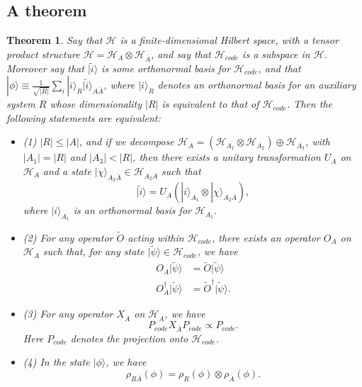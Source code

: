 \documentclass[12pt]{article}
\newcommand{\be}{\begin{equation}}
\newcommand{\ee}{\end{equation}}
\newcommand{\bi}{\begin{itemize}}
\newcommand{\ei}{\end{itemize}}
\newcommand{\ran}{\rangle}
\newcommand{\wt}{\widetilde}
\newcommand{\Hh}{\mathcal{H}}
\newcommand{\HA}{\mathcal{H}_A}
\newcommand{\HAb}{\mathcal{H}_{\ol{A}}}
\newcommand{\Ab}{\ol{A}}
\newcommand{\Hc}{\mathcal{H}_{code}}
\newcommand{\ol}{\overline}
\newtheorem{thm}{Theorem}[section]
\begin{document}
\subsection{A theorem}
\begin{thm}\label{cthm}
Say that $\Hh$ is a finite-dimensional Hilbert space, with a tensor product structure $\Hh=\HA\otimes\HAb$, and say that $\Hc$ is a subspace in $\Hh$.  Moreover say that $|\wt{i}\ran$ is some orthonormal basis for $\Hc$, and that $|\phi\ran\equiv \frac{1}{\sqrt{|R|}} \sum_i |i\ran_R|\wt{i}\ran_{A\ol{A}}$, where $|i\ran_R$ denotes an orthonormal basis for an auxiliary system $R$ whose dimensionality $|R|$ is equivalent to that of $\Hc$.  Then the following statements are equivalent:
\bi
\item[(1)] $|R|\leq |A|$, and if we decompose $\HA=(\Hh_{A_1}\otimes\Hh_{A_2})\oplus \Hh_{A_3}$, with $|A_1|=|R|$ and $|A_3|<|R|$, then there exists a unitary transformation $U_A$ on $\HA$ and a state $|\chi\ran_{A_2\ol{A}}\in \Hh_{A_2\ol{A}}$ such that
\be
|\wt{i}\ran=U_A\left(|i\ran_{A_1}\otimes |\chi\ran_{A_2\ol{A}}\right),
\ee
where $|i\ran_{A_1}$ is an orthonormal basis for $\Hh_{A_1}$.

\item[(2)] For any operator $\wt{O}$ acting within $\Hc$, there exists an operator $O_A$ on $\HA$ such that, for any state $|\wt{\psi}\ran\in \Hc$, we have
\begin{align}\nonumber
O_A|\wt{\psi}\ran&=\wt{O}|\wt{\psi}\ran\\
O_A^\dagger|\wt{\psi}\ran&=\wt{O}^\dagger|\wt{\psi}\ran.
\end{align} 


\item[(3)] For any operator $X_{\ol{A}}$ on $\HAb$, we have
\be
P_{code}X_{\ol{A}}P_{code}\propto P_{code}.
\ee
Here $P_{code}$ denotes the projection onto $\Hc$. 
\item[(4)] In the state $|\phi\ran$, we have
\be
\rho_{R\Ab}(\phi)=\rho_R(\phi)\otimes \rho_{\Ab}(\phi).
\ee

\ei
\end{thm}
\end{document}
